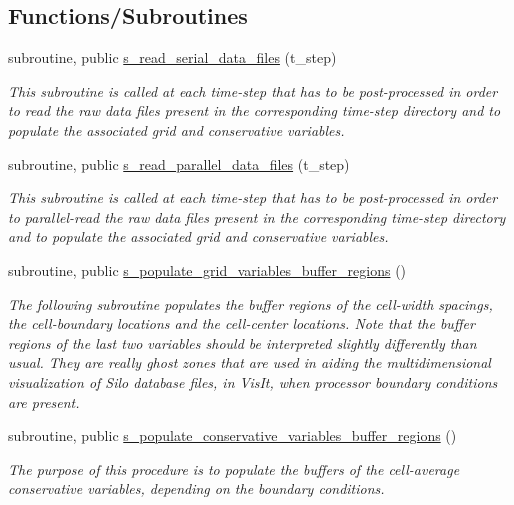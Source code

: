 \subsection*{Functions/\+Subroutines}
\begin{DoxyCompactItemize}
\item 
subroutine, public \hyperlink{namespacem__data__input_a9d69f4bcb771c60157b62bc4b04a6ba1}{s\+\_\+read\+\_\+serial\+\_\+data\+\_\+files} (t\+\_\+step)
\begin{DoxyCompactList}\small\item\em This subroutine is called at each time-\/step that has to be post-\/processed in order to read the raw data files present in the corresponding time-\/step directory and to populate the associated grid and conservative variables. \end{DoxyCompactList}\item 
subroutine, public \hyperlink{namespacem__data__input_a0dd37369dd52b1299b06563f96c25805}{s\+\_\+read\+\_\+parallel\+\_\+data\+\_\+files} (t\+\_\+step)
\begin{DoxyCompactList}\small\item\em This subroutine is called at each time-\/step that has to be post-\/processed in order to parallel-\/read the raw data files present in the corresponding time-\/step directory and to populate the associated grid and conservative variables. \end{DoxyCompactList}\item 
subroutine, public \hyperlink{namespacem__data__input_afc05d7714001946feb2485ce18cb00f6}{s\+\_\+populate\+\_\+grid\+\_\+variables\+\_\+buffer\+\_\+regions} ()
\begin{DoxyCompactList}\small\item\em The following subroutine populates the buffer regions of the cell-\/width spacings, the cell-\/boundary locations and the cell-\/center locations. Note that the buffer regions of the last two variables should be interpreted slightly differently than usual. They are really ghost zones that are used in aiding the multidimensional visualization of Silo database files, in Vis\+It, when processor boundary conditions are present. \end{DoxyCompactList}\item 
subroutine, public \hyperlink{namespacem__data__input_a5cef0da967dbbf0d148b26bd67046c8d}{s\+\_\+populate\+\_\+conservative\+\_\+variables\+\_\+buffer\+\_\+regions} ()
\begin{DoxyCompactList}\small\item\em The purpose of this procedure is to populate the buffers of the cell-\/average conservative variables, depending on the boundary conditions. \end{DoxyCompactList}\item 

\end{DoxyCompactItemize}
